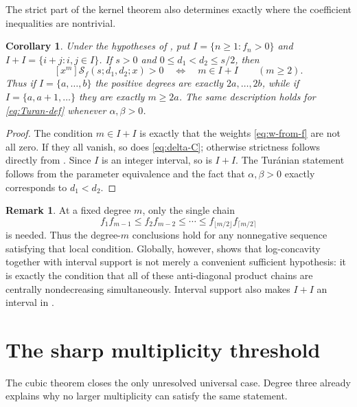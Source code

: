 \documentclass[11pt,a4paper]{amsart}
\numberwithin{equation}{section}
\theoremstyle{plain}
\newtheorem{corollary}[theorem]{Corollary}
\theoremstyle{definition}
\newtheorem{remark}[theorem]{Remark}
\begin{document}
The strict part of the kernel theorem also determines exactly where the coefficient
inequalities are nontrivial.

\begin{corollary}\label{cor:strict}
Under the hypotheses of , put \(I=\{n\ge1:f_n>0\}\) and
\(I+I=\{i+j:i,j\in I\}\).  If \(s>0\) and \(0\le d_1<d_2\le s/2\), then
\[
 [x^m]\mathcal S_f(s;d_1,d_2;x)>0
 \quad\Longleftrightarrow\quad m\in I+I
 \qquad(m\ge2).
\]
Thus if \(I=\{a,\ldots,b\}\) the positive degrees are exactly
\(2a,\ldots,2b\), while if \(I=\{a,a+1,\ldots\}\) they are exactly
\(m\ge2a\).  The same description holds for \eqref{eq:Turan-def} whenever
\(\alpha,\beta>0\).
\end{corollary}

\begin{proof}
The condition \(m\in I+I\) is exactly that the weights \eqref{eq:w-from-f} are
not all zero.  If they all vanish, so does \eqref{eq:delta-C}; otherwise
strictness follows directly from .  Since
\(I\) is an integer interval, so is \(I+I\).  The Tur\'anian statement follows
from the parameter equivalence and the fact that \(\alpha,\beta>0\) exactly
corresponds to \(d_1<d_2\).
\end{proof}

\begin{remark}\label{rem:local-weight}
At a fixed degree \(m\), only the single chain
\[
 f_1f_{m-1}\le f_2f_{m-2}\le\cdots\le
 f_{\lfloor m/2\rfloor}f_{\lceil m/2\rceil}
\]
is needed.  Thus the degree-\(m\) conclusions hold for any nonnegative sequence
satisfying that local condition.  Globally, however,
 shows that log-concavity together with interval
support is not merely a convenient sufficient hypothesis: it is exactly the
condition that all of these anti-diagonal product chains are centrally
nondecreasing simultaneously.  Interval support also makes \(I+I\) an interval
in .
\end{remark}

\section{The sharp multiplicity threshold}\label{sec:threshold}

The cubic theorem closes the only unresolved universal case.  Degree three already
explains why no larger multiplicity can satisfy the same statement.
\end{document}
